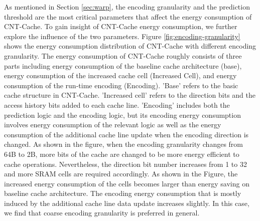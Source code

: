 

As mentioned in Section \ref{sec:warp}, the encoding granularity and the 
prediction threshold are the most critical parameters that affect the 
energy consumption of CNT-Cache. To gain insight of CNT-Cache energy consumption, 
we further explore the influence of the two parameters. 
Figure \ref{fig:encoding-granularity} shows the energy consumption distribution 
of CNT-Cache with different encoding granularity.
The energy consumption of CNT-Cache roughly consists of three parts including 
energy consumption of the baseline cache architecture (base), energy consumption of the 
increased cache cell (Increased Cell), and energy consumption of the run-time encoding (Encoding).
'Base' refers to the basic cache structure in CNT-Cache. 'Increased cell' refers to the 
direction bits and the access history bits added to each cache line. 
'Encoding' includes both the prediction logic and the encoding logic, but its encoding energy 
consumption involves energy consumption of the relevant logic as well as the energy consumption 
of the additional cache line update when the encoding direction is changed.
As shown in the figure, when the encoding granularity changes from 64B to 2B, 
more bits of the cache are changed to be more energy efficient to cache operations. 
Nevertheless, the direction bit number increases from 1 
to 32 and more SRAM cells are required accordingly. As shown in the Figure, the increased energy 
consumption of the cells becomes larger than energy saving on baseline cache architecture.
The encoding energy consumption that is mostly induced by the additional cache line data update 
increases slightly. In this case, we find that coarse encoding granularity is preferred in general.

